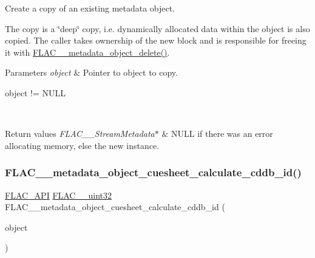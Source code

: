 Create a copy of an existing metadata object.

The copy is a \char`\"{}deep\char`\"{} copy, i.\+e. dynamically allocated data within the object is also copied. The caller takes ownership of the new block and is responsible for freeing it with \hyperlink{group__flac__metadata__object_ga66bbe27dba68ba77be5af83986a280ea}{F\+L\+A\+C\+\_\+\+\_\+metadata\+\_\+object\+\_\+delete()}.


\begin{DoxyParams}{Parameters}
{\em object} & Pointer to object to copy.  
\begin{DoxyCode}
\textcolor{keywordtype}{object} != NULL 
\end{DoxyCode}
 \\
\hline
\end{DoxyParams}

\begin{DoxyRetVals}{Return values}
{\em F\+L\+A\+C\+\_\+\+\_\+\+Stream\+Metadata$\ast$} & {\ttfamily N\+U\+LL} if there was an error allocating memory, else the new instance. \\
\hline
\end{DoxyRetVals}
\mbox{\label{group__flac__metadata__object_ga897138ca0a985d8741f73d6657f38845}} 
\subsubsection{\texorpdfstring{F\+L\+A\+C\+\_\+\+\_\+metadata\+\_\+object\+\_\+cuesheet\+\_\+calculate\+\_\+cddb\+\_\+id()}{FLAC\_\_metadata\_object\_cuesheet\_calculate\_cddb\_id()}}
{\footnotesize\ttfamily \hyperlink{group__flac__export_ga56ca07df8a23310707732b1c0007d6f5}{F\+L\+A\+C\+\_\+\+A\+PI} \hyperlink{ordinals_8h_a9c4005ea7ef8d564b0cc993cdd0e4e5e}{F\+L\+A\+C\+\_\+\+\_\+uint32} F\+L\+A\+C\+\_\+\+\_\+metadata\+\_\+object\+\_\+cuesheet\+\_\+calculate\+\_\+cddb\+\_\+id (\begin{DoxyParamCaption}\item[{\hyperlink{zconf_8h_a2c212835823e3c54a8ab6d95c652660e}{const} \hyperlink{struct_f_l_a_c_____stream_metadata}{F\+L\+A\+C\+\_\+\+\_\+\+Stream\+Metadata} $\ast$}]{object }\end{DoxyParamCaption})}

